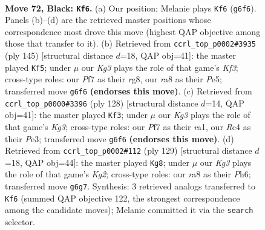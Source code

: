 \documentclass[11pt]{article}
\begin{document}
\clearpage

\begin{figure}[p]\centering
\begin{subfigure}{0.46\textwidth}\centering
\resizebox{\linewidth}{!}{%
\newchessgame
\chessboard[
  setfen={R7/5p2/3Rp1k1/8/P1r1PK2/5P2/8/8 b - - 36 72},
  showmover=false,
  pgfstyle=straightmove, color=movearrow, markmove={g6-f6}
]}
\caption{}
\end{subfigure}\hfill
\begin{subfigure}{0.46\textwidth}\centering
\resizebox{\linewidth}{!}{%
\newchessgame
\chessboard[
  setfen={6R1/8/5k2/4p2K/5p1P/5P2/6P1/6r1 b - - 14 73},
  showmover=false,
  pgfstyle=straightmove, color=movearrow, markmove={f6-f5}
]}
\caption{}
\end{subfigure}
\\[4pt]
\begin{subfigure}{0.46\textwidth}\centering
\resizebox{\linewidth}{!}{%
\newchessgame
\chessboard[
  setfen={8/5p2/5k2/R5p1/p5P1/4P1K1/5P2/r7 w - - 2 65},
  showmover=false,
  pgfstyle=straightmove, color=movearrow, markmove={g3-f3}
]}
\caption{}
\end{subfigure}\hfill
\begin{subfigure}{0.46\textwidth}\centering
\resizebox{\linewidth}{!}{%
\newchessgame
\chessboard[
  setfen={8/3R1pk1/7p/5P2/6PK/5r1P/8/8 b - - 2 65},
  showmover=false,
  pgfstyle=straightmove, color=movearrow, markmove={g7-g8}
]}
\caption{}
\end{subfigure}
\caption{\textbf{Move 72, Black: \texttt{Kf6}.} (a) Our position; Melanie plays \texttt{Kf6} (\texttt{g6f6}). Panels (b)--(d) are the retrieved master positions whose correspondence most drove this move (highest QAP objective among those that transfer to it). (b) Retrieved from \texttt{ccrl\_top\_p0002\#3935} (ply 145) [structural distance $d$=18, QAP obj=41]: the master played \texttt{Kf5}; under $\mu$ our \emph{Kg3} plays the role of that game's \emph{Kf3}; cross-type roles: our \emph{P}f7 as their \emph{r}g8, our \emph{r}a8 as their \emph{P}e5; transferred move \texttt{g6f6} \textbf{(endorses this move)}. (c) Retrieved from \texttt{ccrl\_top\_p0000\#3396} (ply 128) [structural distance $d$=14, QAP obj=41]: the master played \texttt{Kf3}; under $\mu$ our \emph{Kg3} plays the role of that game's \emph{Kg3}; cross-type roles: our \emph{P}f7 as their \emph{r}a1, our \emph{R}c4 as their \emph{P}e3; transferred move \texttt{g6f6} \textbf{(endorses this move)}. (d) Retrieved from \texttt{ccrl\_top\_p0002\#112} (ply 129) [structural distance $d$=18, QAP obj=44]: the master played \texttt{Kg8}; under $\mu$ our \emph{Kg3} plays the role of that game's \emph{Kg2}; cross-type roles: our \emph{r}a8 as their \emph{P}h6; transferred move \texttt{g6g7}. Synthesis: 3 retrieved analogs transferred to \texttt{Kf6} (summed QAP objective 122, the strongest correspondence among the candidate moves); Melanie committed it via the \texttt{search} selector.}
\label{fig:thought-m143}
\end{figure}
\end{document}
